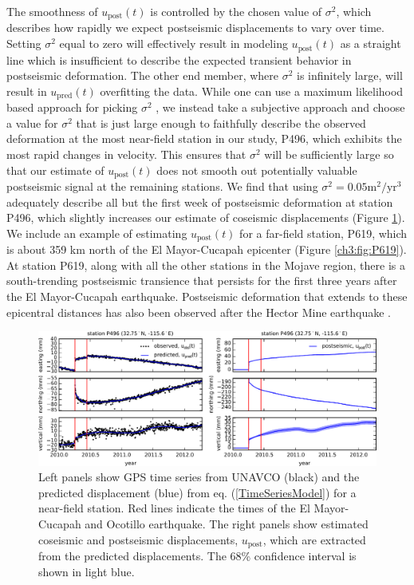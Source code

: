 The smoothness of $u_\mathrm{post}(t)$ is controlled by the chosen value of $\sigma^2$, which describes how rapidly we expect postseismic displacements to vary over time.  Setting $\sigma^2$ equal to zero will effectively result in modeling $u_\mathrm{post}(t)$ as a straight line which is insufficient to describe the expected transient behavior in postseismic deformation. The other end member, where $\sigma^2$ is infinitely large, will result in $u_\mathrm{pred}(t)$ overfitting the data. While one can use a maximum likelihood based approach for picking $\sigma^2$ \citep[e.g.][]{Segall1997}, we instead take a subjective approach and choose a value for $\sigma^2$ that is just large enough to faithfully describe the observed deformation at the most near-field station in our study, P496, which exhibits the most rapid changes in velocity. This ensures that $\sigma^2$ will be sufficiently large so that our estimate of $u_\mathrm{post}(t)$ does not smooth out potentially valuable postseismic signal at the remaining stations. We find that using $\sigma^2 = 0.05 \mathrm{m}^2 / \mathrm{yr}^3$ adequately describe all but the first week of postseismic deformation at station P496, which slightly increases our estimate of coseismic displacements (Figure \ref{ch3:fig:P496}).  We include an example of estimating $u_\mathrm{post}(t)$ for a far-field station, P619, which is about 359 km north of the El Mayor-Cucapah epicenter (Figure \ref{ch3:fig:P619}).  At station P619, along with all the other stations in the Mojave region, there is a south-trending postseismic transience that persists for the first three years after the El Mayor-Cucapah earthquake.  Postseismic deformation that extends to these epicentral distances has also been observed after the Hector Mine earthquake \citep{Freed2007a}.

\begin{figure}
\includegraphics[scale=1.0]{ch3/figures/2016jb013114-p02}
\centering
\caption{Left panels show GPS time series from UNAVCO (black) and the predicted displacement (blue) from eq. (\ref{TimeSeriesModel}) for a near-field station.  Red lines indicate the times of the El Mayor-Cucapah and Ocotillo earthquake. The right panels show estimated coseismic and postseismic displacements, $u_\mathrm{post}$, which are extracted from the predicted displacements.  The 68\% confidence interval is shown in light blue.}
\label{ch3:fig:P496}
\end{figure}

